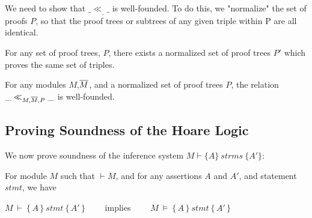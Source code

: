 We need to show that $\_ \ll_{\_} \_$ is well-founded. 
To do this, we   "normalize" the set of proofs $P$, so that  
the proof trees or subtrees of any given triple within P are all identical.

\begin{auxLemma}
\label{lemma:normal:one}
For any set of proof trees, $P$, there exists a normalized set of proof trees $P'$ which proves the same set of triples.
\end{auxLemma}

\begin{auxLemma}
\label{lemma:normal:two}
For any modules $M$,$\overline{M}$,   and  a normalized  set of proof trees $P$, the relation $\_ \ll_{M,\overline{M},P}  \_$
is well-founded.
\end{auxLemma}

\subsection{Proving Soundness of the Hoare Logic}
\label{sect:prove:sound}
We now prove soundness of the inference system $M \vdash \{ A \}\ strms\  \{ A' \} $:

\begin{theorem}
For module  $M$ %
such that  $\vdash M$, and for any assertions $A$ and $A'$, and statement  $stmt$, we have

\begin{center}
$M\ \vdash\  \{\, A \,  \}\ stmt\  \{\, A' \, \}$ \ \ \ \ implies \ \ \ \ $M\ \models\  \{\, A \,  \}\ stmt\  \{\, A' \, \}$
\end{center}

\end{theorem}


%

